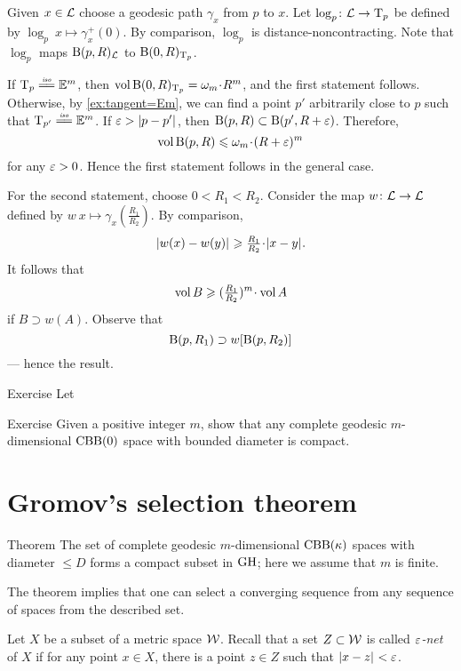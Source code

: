 Given $x\in\mathcal{L}$ choose a geodesic path $\gamma_x$ from $p$ to $x$.
Let $\log_p\colon\mathcal{L}\to \mathrm{T}_p$ be defined by $\log_p\:x\mapsto \gamma_x^+(0)$.
By comparison, $\log_p$ is distance-noncontracting.
Note that $\log_p$ maps $\mathrm{B}{}(p,R)_{\mathcal{L}}$ to $\mathrm{B}{}(0,R)_{\mathrm{T}_p}$.

If $\T_p\iso \EE^m$, then $\vol\oBall(0,R)_{\T_p}=\omega_m\cdot R^m$,
and the first statement follows.
Otherwise, by \ref{ex:tangent=Em}, we can find a point $p'$ arbitrarily close to $p$ such that $\T_{p'}\iso \EE^m$.
If $\eps>\dist{p}{p'}{}$, then $\mathrm{B}{}(p,R)\subset \mathrm{B}{}(p',R+\varepsilon)$.
Therefore,
\[\vol \oBall(p,R)\le \omega_m\cdot (R+\eps)^m\]
for any $\varepsilon>0$.
Hence the first statement follows in the general case.

For the second statement, choose $0<R_1<R_2$.
Consider the map $w\colon \mathcal{L}\to \mathcal{L}$ defined by $w\:x\mapsto \gamma_x(\tfrac {R_1}{R_2})$.
By comparison,
\[\dist{w(x)}{w(y)}{}\ge \tfrac {R_1}{R_2}\cdot \dist{x}{y}{}.\]
It follows that 
\[\vol B\ge (\tfrac {R_1}{R_2})^m\cdot\vol A\]
if $B\supset w(A)$.
Observe that 
\[\mathrm{B}{}(p,R_1) \supset w[\mathrm{B}{}(p,R_2)]\]
--- hence the result.
\qeds

\begin{thm}{Exercise}\label{ex:BG}
Let 
\end{thm}


\begin{thm}{Exercise}\label{ex:diam-compact}
Given a positive integer $m$, 
show that any complete geodesic $m$-dimensional $\mathrm{CBB}(0)$ space with bounded diameter is compact.
\end{thm}

\section{Gromov's selection theorem}

\begin{thm}{Theorem}\label{thm:gromov-compactness}
The set of complete geodesic $m$-dimensional $\mathrm{CBB}(\kappa)$ spaces with diameter $\le D$ forms a compact subset in $\operatorname{\rm GH}\nolimits$;
here we assume that $m$ is finite.
\end{thm}

The theorem implies that one can select a converging sequence 
from any sequence of spaces from the described set.


Let $X$ be a subset of a metric space $\mathcal{W}$.
Recall that a set $Z\subset \mathcal{W}$ is called \emph{$\varepsilon$-net} of $X$ if for any point $x\in X$, there is a point $z\in Z$ such that $\dist{x}{z}{}<\eps$.

